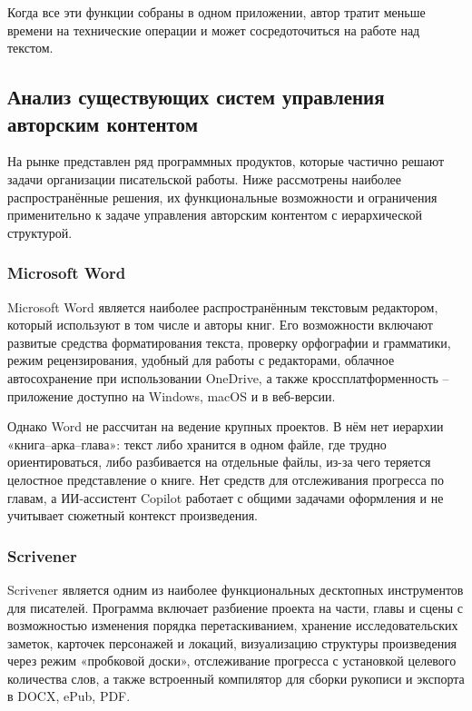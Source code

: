 Когда все эти функции собраны в одном приложении, автор тратит меньше времени на технические операции и может сосредоточиться на работе над текстом.

\subsection{Анализ существующих систем управления авторским контентом}

На рынке представлен ряд программных продуктов, которые частично решают задачи организации писательской работы. Ниже рассмотрены наиболее распространённые решения, их функциональные возможности и ограничения применительно к задаче управления авторским контентом с иерархической структурой.

\subsubsection{Microsoft Word}

Microsoft Word является наиболее распространённым текстовым редактором, который используют в том числе и авторы книг. Его возможности включают развитые средства форматирования текста, проверку орфографии и грамматики, режим рецензирования, удобный для работы с редакторами, облачное автосохранение при использовании OneDrive, а также кроссплатформенность -- приложение доступно на Windows, macOS и в веб-версии.

Однако Word не рассчитан на ведение крупных проектов. В нём нет иерархии «книга--арка--глава»: текст либо хранится в одном файле, где трудно ориентироваться, либо разбивается на отдельные файлы, из-за чего теряется целостное представление о книге. Нет средств для отслеживания прогресса по главам, а ИИ-ассистент Copilot работает с общими задачами оформления и не учитывает сюжетный контекст произведения.

\subsubsection{Scrivener}

Scrivener является одним из наиболее функциональных десктопных инструментов для писателей. Программа включает разбиение проекта на части, главы и сцены с возможностью изменения порядка перетаскиванием, хранение исследовательских заметок, карточек персонажей и локаций, визуализацию структуры произведения через режим «пробковой доски», отслеживание прогресса с установкой целевого количества слов, а также встроенный компилятор для сборки рукописи и экспорта в DOCX, ePub, PDF.

